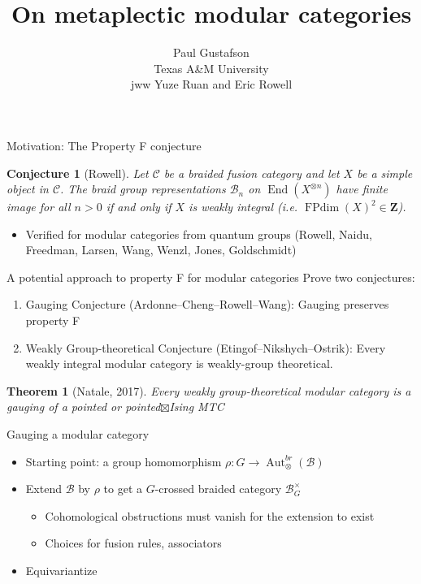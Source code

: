 \documentclass{beamer}
\title{On metaplectic modular categories}
\date{Paul Gustafson  \\ Texas A\&M University \\   jww Yuze Ruan and Eric Rowell}
\newcommand{\mB}{\mathcal{B}}
\newtheorem{thm}[theorem]{Theorem}
\newtheorem{conj}[theorem]{Conjecture}
\DeclareMathOperator{\FPdim}{FPdim}
\DeclareMathOperator{\Aut}{Aut}
\DeclareMathOperator{\End}{End}
\begin{document}
\frame{\titlepage}


\begin{frame}{Motivation: The Property F conjecture}
\begin{conj}[Rowell]
Let $\mathcal C$ be a braided fusion category and let $X$ be a simple object in $\mathcal C$.  The braid group representations $\mathcal B_n$ on $\End(X^{\otimes n})$ have finite image for all $n>0$ if and only if  $X$ is weakly integral (i.e. $\FPdim(X)^2 \in \mathbf Z$).
\end{conj}

\begin{itemize}
\item Verified for modular categories from quantum groups (Rowell, Naidu, Freedman, Larsen, Wang, Wenzl, Jones, Goldschmidt) 
\end{itemize}
\end{frame}


\begin{frame}{A potential approach to property F for modular categories}
  Prove two conjectures:
  \begin{enumerate}[(1)]
  \item Gauging Conjecture (Ardonne--Cheng--Rowell--Wang): Gauging preserves property F
  \item Weakly Group-theoretical Conjecture (Etingof--Nikshych--Ostrik): Every weakly integral modular category is weakly-group theoretical.
  \end{enumerate}

  \begin{thm}[Natale, 2017]
    Every weakly group-theoretical modular category is a gauging of a pointed or pointed$\boxtimes$Ising MTC
  \end{thm}
\end{frame}


\begin{frame}{Gauging a modular category}
  \begin{itemize}
  \item Starting point: a group homomorphism $\rho: G \to \Aut_\otimes^{br}(\mB)$
  \item Extend $\mB$ by $\rho$ to get a $G$-crossed braided category $\mB_G^\times$
    \begin{itemize}
    \item Cohomological obstructions must vanish for the extension to exist
    \item Choices for fusion rules, associators 
    \end{itemize}
  \item Equivariantize 
  \end{itemize}
\end{frame}
\end{document}

